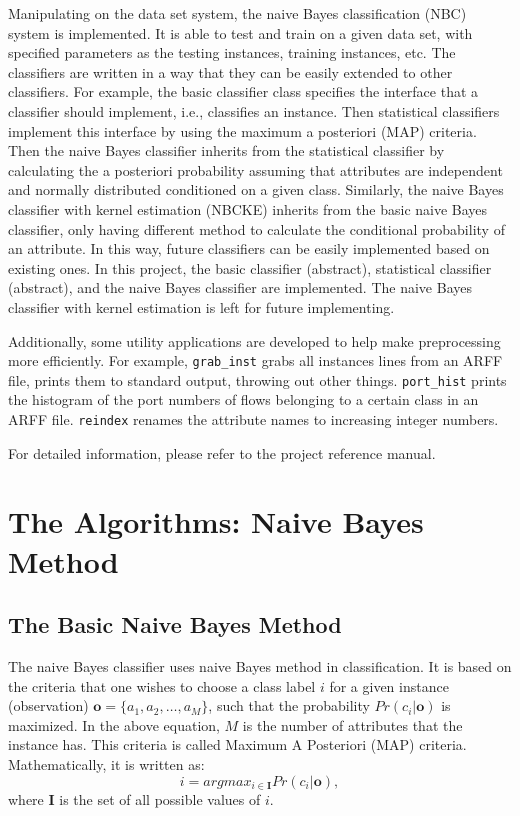\documentclass[a4paper,12pt]{article}
\begin{document}
Manipulating on the data set system, the naive Bayes classification (NBC) system is implemented. It is able to test and train on a given data set, with specified parameters as the testing instances, training instances, etc. The classifiers are written in a way that they can be easily extended to other classifiers. For example, the basic classifier class specifies the interface that a classifier should implement, i.e., classifies an instance. Then statistical classifiers implement this interface by using the maximum a posteriori (MAP) criteria. Then the naive Bayes classifier inherits from the statistical classifier by calculating the a posteriori probability assuming that attributes are independent and normally distributed conditioned on a given class. Similarly, the naive Bayes classifier with kernel estimation (NBCKE) inherits from the basic naive Bayes classifier, only having different method to calculate the conditional probability of an attribute. In this way, future classifiers can be easily implemented based on existing ones. In this project, the basic classifier (abstract), statistical classifier (abstract), and the naive Bayes classifier are implemented. The naive Bayes classifier with kernel estimation is left for future implementing.

Additionally, some utility applications are developed to help make preprocessing more efficiently. For example, \verb|grab_inst| grabs all instances lines from an ARFF file, prints them to standard output, throwing out other things. \verb|port_hist| prints the histogram of the port numbers of flows belonging to a certain class in an ARFF file. \verb|reindex| renames the attribute names to increasing integer numbers.

For detailed information, please refer to the project reference manual.

\section{The Algorithms: Naive Bayes Method}
\subsection{The Basic Naive Bayes Method}
The naive Bayes classifier uses naive Bayes method in classification. It is based on the criteria that one wishes to choose a class label $i$ for a given instance (observation) $\mathbf{o}=\{a_1,a_2,\ldots,a_M\}$, such that the probability $Pr(c_i|\mathbf{o})$ is maximized. In the above equation, $M$ is the number of attributes that the instance has. This criteria is called Maximum A Posteriori (MAP) criteria. Mathematically, it is written as:
\begin{equation}
    \label{eq:map}
    i = argmax_{i \in \mathbf{I}} {Pr(c_i|\mathbf{o})},
\end{equation}
where $\mathbf{I}$ is the set of all possible values of $i$.
\end{document}

